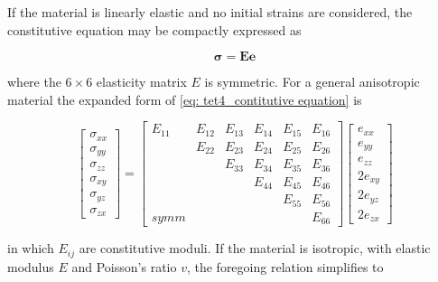 If the material is linearly elastic and no initial strains are considered, the constitutive equation may be compactly expressed as

\begin{equation} \label{eq: tet4_contitutive equation}
\mathbf{\sigma} = \mathbf{E}\mathbf{e}
\end{equation}

where the $ 6 \times 6 $ elasticity matrix $ E $ is symmetric. For a general anisotropic material the expanded form of \ref{eq: tet4_contitutive equation} is 

\begin{equation}
\begin{bmatrix}
\sigma_{xx}\\
\sigma_{yy}\\
\sigma_{zz}\\
\sigma_{xy}\\
\sigma_{yz}\\
\sigma_{zx}
\end{bmatrix} = \begin{bmatrix}
E_{11} & E_{12} & E_{13} & E_{14} & E_{15} & E_{16}\\
       & E_{22} & E_{23} & E_{24} & E_{25} & E_{26}\\
       &        & E_{33} & E_{34} & E_{35} & E_{36}\\
       &        &        & E_{44} & E_{45} & E_{46}\\
       &        &        &        & E_{55} & E_{56}\\
symm   &        &        &        &        & E_{66}
\end{bmatrix} \begin{bmatrix}
e_{xx}\\
e_{yy}\\
e_{zz}\\
2e_{xy}\\
2e_{yz}\\
2e_{zx}
\end{bmatrix}
\end{equation}

in which $ E_{ij} $ are constitutive moduli. If the material is isotropic, with elastic modulus $ E $ and Poisson's ratio $ v $, the foregoing relation simplifies to

